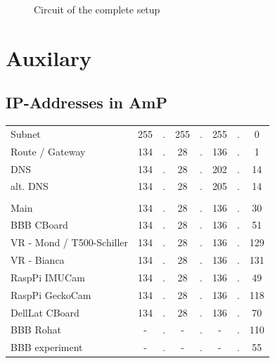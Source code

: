 \documentclass[
	fontsize=10pt
	paper=a4
]{scrartcl}
\begin{document}
\begin{figure}[h!]
\caption{Circuit of the complete setup}
\label{fig:circuit_cboard}
\end{figure}




\section{Auxilary}


\subsection{IP-Addresses in AmP}
\begin{tabular}{l|ccccccc}
Subnet 		& 255 &.& 255 &.& 255 &.& 0 \\
Route / Gateway 	& 134 &.& 28  &.& 136 &.& 1 \\
DNS	 	& 134 &.& 28  &.& 202 &.& 14 \\
alt. DNS 	& 134 &.& 28  &.& 205 &.& 14 \\ \hline
\\
Main	 	& 134 &.& 28  &.& 136 &.& 30 \\
BBB CBoard 	& 134 &.& 28  &.& 136 &.& 51 \\
VR - Mond / T500-Schiller	& 134 &.& 28  &.& 136 &.& 129 \\
VR - Bianca	& 134 &.& 28  &.& 136 &.& 131 \\
RaspPi IMUCam 	& 134 &.& 28  &.& 136 &.& 49 \\
RaspPi GeckoCam	& 134 &.& 28  &.& 136 &.& 118 \\
DellLat CBoard 	& 134 &.& 28  &.& 136 &.& 70 \\
BBB Rohat 	& - &.& -  &.& - &.& 110 \\
BBB experiment 	& - &.& -  &.& - &.& 55 \\

\end{tabular}
\end{document}
